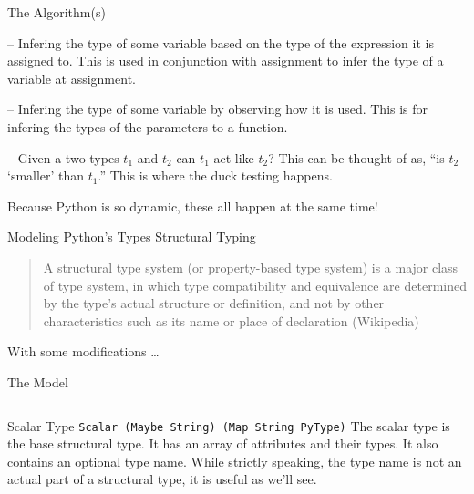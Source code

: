 \documentclass[12pt,t]{beamer}
\newcommand{\codehs}{\texttt}
\newcommand{\vitem}{\vfill\item}
\begin{document}
\begin{frame}{The Algorithm(s)}
    \begin{description}
        \vitem[Type Inference by Evaluation] -- Infering the type of some
        variable based on the type of the expression it is assigned to. This is
        used in conjunction with assignment to infer the type of a variable at assignment.

        \vitem[Type Inference by Observance] -- Infering the type of some
        variable by observing how it is used. This is for infering the types of the
        parameters to a function.

        \vitem[Type Matching] -- Given a two types $t_1$ and $t_2$ can $t_1$ act like $t_2$?
        This can be thought of as, ``is $t_2$ `smaller' than $t_1$.'' This is where the
        duck testing happens.
    \end{description}
    Because Python is so dynamic, these all happen at the same time!
\end{frame}

\begin{frame}{Modeling Python's Types}
    \vspace{0.5cm}
    {\large \color{subtitle} {Structural Typing}}

    \begin{quote}
        A structural type system (or property-based
        type system) is a major class of type system, in which type
        compatibility and equivalence are determined by the type's actual
        structure or definition, and not by other characteristics such as its
        name or place of declaration (Wikipedia)
    \end{quote}

    \vfill
    With some modifications \ldots
\end{frame}

\begin{frame}{The Model}
    \inputminted{haskell}{code/model.hs}
\end{frame}

\begin{frame}{Scalar Type}
    \vfill
    \codehs{Scalar (Maybe String) (Map String PyType)}
    \vfill
    The scalar type is the base structural type. It
    has an array of attributes and their types. It also
    contains an optional type name. While strictly speaking,
    the type name is not an actual part of a structural type,
    it is useful as we'll see.
    \vfill
\end{frame}
\end{document}

